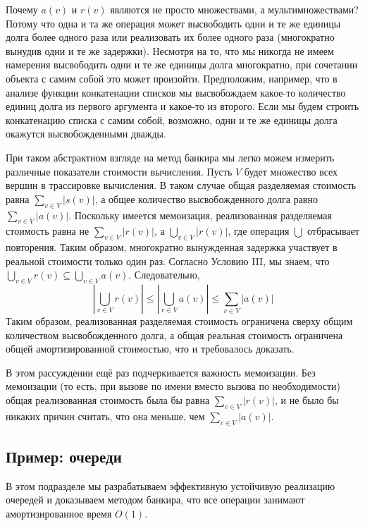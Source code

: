 Почему $a(v)$ и $r(v)$ являются не просто множествами, а
мультимножествами? Потому что одна и та же операция может высвободить
одни и те же единицы долга более одного раза или реализовать их более
одного раза (многократно вынудив одни и те же задержки). Несмотря на
то, что мы никогда не имеем намерения высвободить одни и те же единицы долга
многократно, при сочетании объекта с самим собой это может произойти.
Предположим, например, что в анализе функции конкатенации списков мы
высвобождаем какое-то количество единиц долга из первого аргумента и
какое-то из второго. Если мы будем строить конкатенацию списка с самим
собой, возможно, одни и те же единицы долга окажутся высвобожденными
дважды.

При таком абстрактном взгляде на метод банкира мы легко можем измерить
различные показатели стоимости вычисления. Пусть $V$ будет множество
всех вершин в трассировке вычисления. В таком случае общая разделяемая
стоимость равна $\sum_{v \in V}|s(v)|$, а общее количество
высвобожденного долга равно $\sum_{v \in V}|a(v)|$. Поскольку имеется
мемоизация, реализованная разделяемая стоимость равна не 
$\sum_{v \in V}|r(v)|$, а $\bigcup_{v \in V}|r(v)|$, где операция $\bigcup$
отбрасывает повторения. Таким образом, многократно вынужденная
задержка участвует в реальной стоимости только один раз. Согласно
Условию III, мы знаем, что 
$\bigcup_{v \in V}r(v) \subseteq \bigcup_{v \in V}
a(v)$. Следовательно,
$$
|\bigcup_{v \in V} r(v)| \le |\bigcup_{v \in V} a(v)| \le \sum_{v \in V} |a(v)|
$$
Таким образом, реализованная разделяемая стоимость ограничена сверху
общим количеством высвобожденного долга, а общая реальная стоимость
ограничена общей амортизированной стоимостью, что и требовалось
доказать.

\begin{remark}
  В этом рассуждении ещё раз подчеркивается важность мемоизации. Без
  мемоизации (то есть, при вызове по имени вместо вызова по
  необходимости) общая реализованная стоимость была бы равна 
  $\sum_{v \in V} |r(v)|$, и не было бы никаких причин считать, что
  она меньше, чем $\sum_{v \in V} |a(v)|$.
\end{remark}

\subsection{Пример: очереди}
\label{sc:6.3.2}

В этом подразделе мы разрабатываем эффективную устойчивую реализацию
очередей и доказываем методом банкира, что все операции занимают амортизированное время
$O(1)$.

